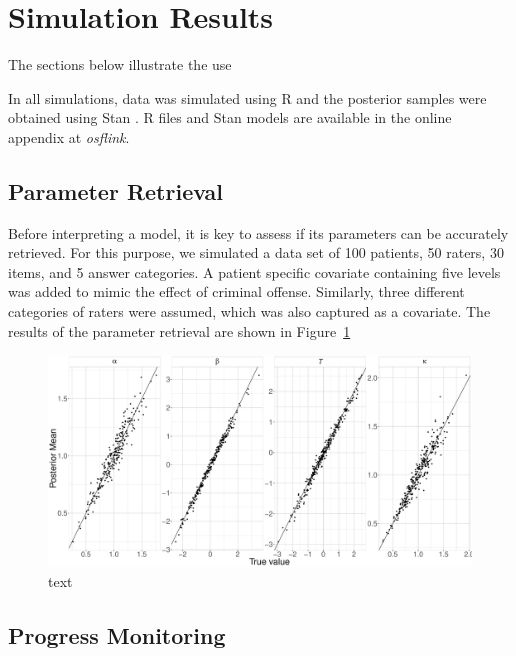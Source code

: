 \documentclass{article}
\newcommand{\osflink}{\textit{osflink}}
\begin{document}
\section*{Simulation Results}

The sections below illustrate the use  

In all simulations, data was simulated using R \cite{R} and the posterior samples were obtained using Stan \cite{CarpenterEtAl2017Stan}. R files and Stan models are available in the online appendix at \osflink{}.

\subsection*{Parameter Retrieval}
Before interpreting a model, it is key to assess if its parameters can be accurately retrieved. For this purpose, we simulated a data set of 100 patients, 50 raters, 30 items, and 5 answer categories. A patient specific covariate containing five levels was added to mimic the effect of criminal offense. Similarly, three different categories of raters were assumed, which was also captured as a covariate. The results of the parameter retrieval are shown in Figure~\ref{fig:parameterRecovery}

\begin{figure}[!ht]
	\centering
	\includegraphics[width= \textwidth]{figures/parameterRecoveryModel1.pdf}
	\caption{text}
	\label{fig:parameterRecovery}
\end{figure}

\subsection*{Progress Monitoring}
\end{document}

